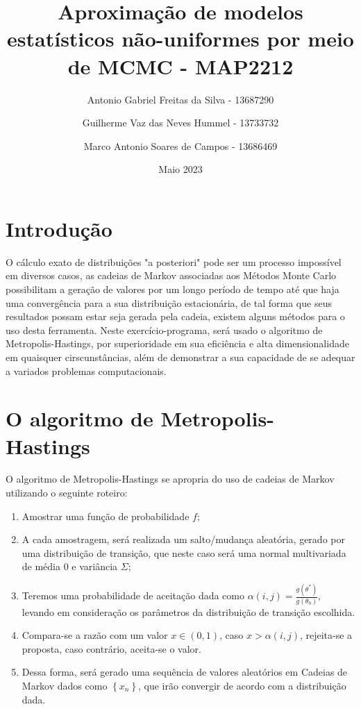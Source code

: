 \documentclass[a4paper]{article}
\title{Aproximação de modelos estatísticos não-uniformes por meio de MCMC - MAP2212}
\author{Antonio Gabriel Freitas da Silva - 13687290 \and Guilherme Vaz das Neves Hummel -  13733732 \and Marco Antonio Soares de Campos -  13686469}
\date{Maio 2023}
\begin{document}
\maketitle

\section{Introdução} 

O cálculo exato de distribuições "a posteriori" pode ser um processo impossível em diversos casos, as cadeias de Markov associadas aos Métodos Monte Carlo possibilitam a geração de valores por um longo período de tempo até que haja uma convergência para a sua distribuição estacionária, de tal forma que seus resultados possam estar seja gerada pela cadeia, existem alguns métodos para o uso desta ferramenta. Neste exercício-programa, será usado o algoritmo de Metropolis-Hastings, por superioridade em sua eficiência e alta dimensionalidade em quaisquer cirscunstâncias, além de demonstrar a sua capacidade de se adequar a variados problemas computacionais.  

\section{O algoritmo de Metropolis-Hastings}

O algoritmo de Metropolis-Hastings se apropria do uso de cadeias de Markov utilizando o seguinte roteiro:

\begin{enumerate}
    \item Amostrar uma função de probabilidade $f$;
    \item A cada amostragem, será realizada um salto/mudança aleatória, gerado por uma distribuição de transição, que neste caso será uma normal multivariada de média 0 e variância $\Sigma$;
    \item Teremos uma probabilidade de aceitação dada como $\alpha(i, j) = \frac{g(\theta^*)}{g(\theta_0)}$, levando em consideração os parâmetros da distribuição de transição escolhida.
    \item Compara-se a razão com um valor $x \in (0, 1)$, caso $x > \alpha(i, j)$, rejeita-se a proposta, caso contrário, aceita-se o valor.
    \item Dessa forma, será gerado uma sequência de valores aleatórios em Cadeias de Markov dados como $  \left\{  x_n \right\} $, que irão convergir de acordo com a distribuição dada.
    
\end{enumerate}
    
\end{document}
